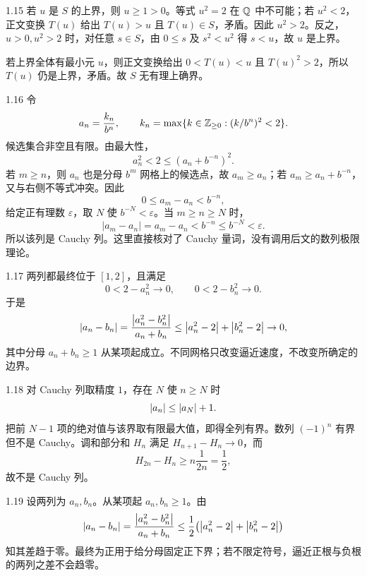 \begin{solution}{1.15}
若 \(u\) 是 \(S\) 的上界，则 \(u\ge1>0\)。等式 \(u^2=2\) 在 \(\mathbb{Q}\) 中不可能；若 \(u^2<2\)，正文变换 \(T(u)\) 给出 \(T(u)>u\) 且 \(T(u)\in S\)，矛盾。因此 \(u^2>2\)。反之，\(u>0,u^2>2\) 时，对任意 \(s\in S\)，由 \(0\le s\) 及 \(s^2<u^2\) 得 \(s<u\)，故 \(u\) 是上界。

若上界全体有最小元 \(u\)，则正文变换给出 \(0<T(u)<u\) 且 \(T(u)^2>2\)，所以 \(T(u)\) 仍是上界，矛盾。故 \(S\) 无有理上确界。
\end{solution}

\begin{solution}{1.16}
令
\[
 a_n=\frac{k_n}{b^n},\qquad
 k_n=\max\{k\in\mathbb{Z}_{\ge0}:(k/b^n)^2<2\}.
\]
候选集合非空且有限。由最大性，
\[
 a_n^2<2\le(a_n+b^{-n})^2.
\]
若 \(m\ge n\)，则 \(a_n\) 也是分母 \(b^m\) 网格上的候选点，故 \(a_m\ge a_n\)；若 \(a_m\ge a_n+b^{-n}\)，又与右侧不等式冲突。因此
\[
 0\le a_m-a_n<b^{-n},
\]
给定正有理数 \(\varepsilon\)，取 \(N\) 使 \(b^{-N}<\varepsilon\)。当
\(m\ge n\ge N\) 时，
\[
  |a_m-a_n|=a_m-a_n<b^{-n}\le b^{-N}<\varepsilon.
\]
所以该列是 Cauchy 列。这里直接核对了 Cauchy 量词，没有调用后文的数列极限理论。
\end{solution}

\begin{solution}{1.17}
两列都最终位于 \([1,2]\)，且满足
\[
 0<2-a_n^2\to0,\qquad0<2-b_n^2\to0.
\]
于是
\[
 \left|a_n-b_n\right|
 =\frac{\left|a_n^2-b_n^2\right|}{a_n+b_n}
 \le\left|a_n^2-2\right|+\left|b_n^2-2\right|\to0,
\]
其中分母 \(a_n+b_n\ge1\) 从某项起成立。不同网格只改变逼近速度，不改变所确定的边界。
\end{solution}

\begin{solution}{1.18}
对 Cauchy 列取精度 \(1\)，存在 \(N\) 使 \(n\ge N\) 时
\[
 \left|a_n\right|\le\left|a_N\right|+1.
\]
把前 \(N-1\) 项的绝对值与该界取有限最大值，即得全列有界。数列 \((-1)^n\) 有界但不是 Cauchy。调和部分和 \(H_n\) 满足 \(H_{n+1}-H_n\to0\)，而
\[
 H_{2n}-H_n\ge n\frac1{2n}=\frac12,
\]
故不是 Cauchy 列。
\end{solution}

\begin{solution}{1.19}
设两列为 \(a_n,b_n\)。从某项起 \(a_n,b_n\ge1\)。由
\[
 \left|a_n-b_n\right|
 =\frac{\left|a_n^2-b_n^2\right|}{a_n+b_n}
 \le\frac12\bigl(\left|a_n^2-2\right|+\left|b_n^2-2\right|\bigr)
\]
知其差趋于零。最终为正用于给分母固定正下界；若不限定符号，逼近正根与负根的两列之差不会趋零。
\end{solution}

